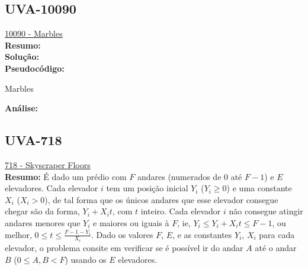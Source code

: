 \subsection{UVA-10090}
\href{https://uva.onlinejudge.org/index.php?option=onlinejudge&page=show_problem&problem=1031}{10090 - Marbles}\\


\textbf{Resumo:}
\\

\textbf{Solução:}
\\

\textbf{Pseudocódigo:}
\begin{algorithm}
\caption{Marbles}
\begin{algorithmic}[1]

\EndProcedure
\end{algorithmic}
\end{algorithm}


\textbf{Análise:}





\subsection{UVA-718}
\href{https://uva.onlinejudge.org/index.php?option=com_onlinejudge&Itemid=8&page=show_problem&problem=659}{718 - Skyscraper Floors}\\

\textbf{Resumo:}
É dado um prédio com $F$ andares (numerados de $0$ até $F-1$) e $E$ elevadores. Cada elevador $i$ tem um posição inicial $Y_i$ ($Y_i \geq 0$) e uma constante $X_i$ ($X_i > 0$), 
de tal forma que os únicos andares que esse elevador consegue chegar são da forma, $Y_i+X_it$, com $t$ inteiro. 
Cada elevador $i$ não consegue atingir andares menores que $Y_i$ e maiores ou iguais à $F$, ie, $Y_i \leq Y_i+X_it \leq F-1$, ou melhor, $0 \leq t \leq \frac{F-1-Y_i}{X_i}$.
Dado os valores $F$, $E$, e as constantes $Y_i$, $X_i$ para cada elevador, o problema consite em verificar se é possível ir do andar $A$ até o andar $B$ ($0\leq A,B <F$)
usando os $E$ elevadores.
\\

